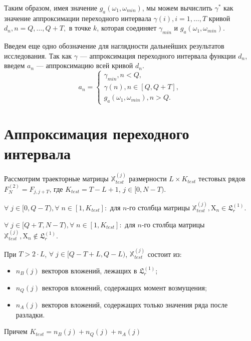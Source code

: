 \documentclass[specialist, substylefile = spbu.rtx,
			   subf, href, 12pt]{disser}
\begin{document}
Таким образом, имея значение $ g_a(\omega_1, \omega_{min}) $, мы можем вычислить $ \gamma^* $ как значение аппроксимации переходного интервала $ \gamma(i), i=1, \dots, T $ кривой $ d_n, n=Q, \dots, Q+T, $ в точке $ k $, которая соединяет $ \gamma_{min} $ и $ g_a(\omega_1, \omega_{min}) $. 

Введем еще одно обозначение для наглядности дальнейших результатов исследования. Так как $ \gamma $ --- аппроксимация переходного интервала функции $ d_n $, введем $ a_n $ --- аппроксимацию всей кривой $ d_n $.
\begin{equation}\label{eq:a_n}
	a_n = 
	\begin{cases}
		\gamma_{min}, n < Q,\\
		\gamma(n), n \in [Q, Q+T],\\
		g_a(\omega_1, \omega_{min}), n > Q.
	\end{cases}
\end{equation}


\section{Аппроксимация переходного интервала}\label{ch:approx_d_n}
Рассмотрим траекторные матрицы $ \mathbb{X}_{test}^{(j)} $ размерности $ L \times K_{test} $ тестовых рядов $ F_N^{(2)} = F_{j, j+T} $, где $ K_{test} = T - L + 1 $, $ j \in [0, N-T) $. 

$ \forall \; j \in [0, Q - T), \forall \; n \in [1, K_{test}]: $ для $ n $-го столбца матрицы $ \mathbb{X}_{test}^{(j)},  \mathrm{X}_n \in \mathfrak{L}_r^{(1)} $. 

$ \forall \; j \in [Q+T, N-T), \forall \; n \in [1, K_{test}]: $ для $ n $-го столбца матрицы $ \mathbb{X}_{test}^{(j)},  \mathrm{X}_n \notin \mathfrak{L}_r^{(1)} $. 

\bigskip

При $ T > 2 \cdot L $, $ \forall \; j \in [Q - T + L, Q - L)$, $ \mathbb{X}_{test}^{(j)} $ состоит из:

\begin{itemize}
	\item $ n_B(j) $ векторов вложений, лежащих в $ \mathfrak{L}_r^{(1)} $;
	\item $ n_Q(j) $ векторов вложений, содержащих момент возмущения;
	\item $ n_A(j) $ векторов вложений, содержащих только значения ряда после разладки.
\end{itemize}

Причем $ K_{test} = n_B(j) + n_Q(j) + n_A(j) $
\end{document}
